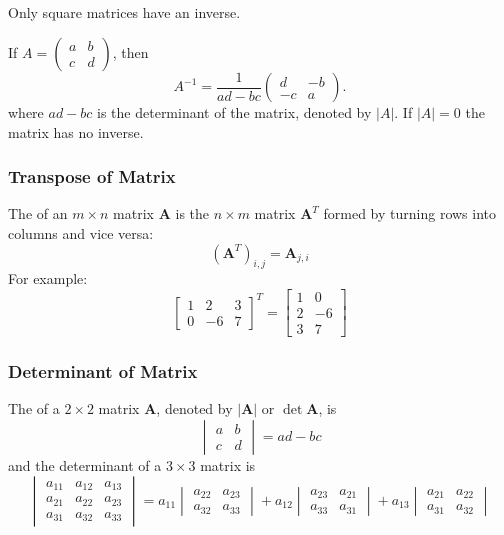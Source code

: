 Only square matrices have an inverse.

If $A=\begin{pmatrix}a&b\\c&d\end{pmatrix}$, then
\[ A^{-1}=\frac{1}{ad-bc}\begin{pmatrix}d&-b\\-c&a\end{pmatrix}. \]
where $ad-bc$ is the determinant of the matrix, denoted by $|A|$. If $|A|=0$ the matrix has no inverse.

\subsubsection{Transpose of Matrix}
The  of an $m \times n$ matrix $\mathbf{A}$ is the $n \times m$ matrix $\mathbf{A}^T$ formed by turning rows into columns and vice versa:
\[ (\mathbf{A}^T)_{i,j} = \mathbf{A}_{j,i} \]
For example:
\[ \begin{bmatrix}
    1 & 2 & 3 \\
    0 & -6 & 7
\end{bmatrix}^T =
\begin{bmatrix}
    1 & 0 \\
    2 & -6 \\
    3 & 7
\end{bmatrix} \]

\subsubsection{Determinant of Matrix}
The  of a $2 \times 2$ matrix $\mathbf{A}$, denoted by $|\mathbf{A}|$ or $\det\mathbf{A}$, is
\[ \begin{vmatrix}
    a & b\\
    c & d
\end{vmatrix} = ad-bc \]
and the determinant of a $3 \times 3$ matrix is
\[ \begin{vmatrix}
    a_{11} & a_{12} & a_{13}\\ 
    a_{21} & a_{22} & a_{23}\\
    a_{31} & a_{32} & a_{33} 
\end{vmatrix}
= a_{11}\begin{vmatrix} 
    a_{22} & a_{23} \\ 
    a_{32} & a_{33}
\end{vmatrix} 
+ a_{12}\begin{vmatrix}
    a_{23} & a_{21} \\ 
    a_{33} & a_{31}
\end{vmatrix} 
+ a_{13}\begin{vmatrix}
    a_{21} & a_{22} \\
    a_{31} & a_{32}
\end{vmatrix}
 \]

